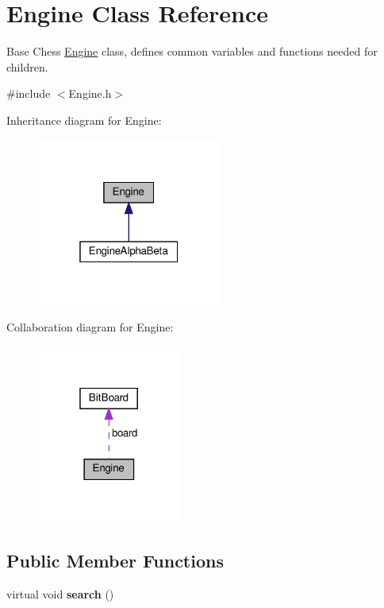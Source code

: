 \hypertarget{classEngine}{}\section{Engine Class Reference}
\label{classEngine}


Base Chess \hyperlink{classEngine}{Engine} class, defines common variables and functions needed for children.  




{\ttfamily \#include $<$Engine.\+h$>$}



Inheritance diagram for Engine\+:\nopagebreak
\begin{figure}[H]
\begin{center}
\leavevmode
\includegraphics[width=172pt]{classEngine__inherit__graph}
\end{center}
\end{figure}


Collaboration diagram for Engine\+:\nopagebreak
\begin{figure}[H]
\begin{center}
\leavevmode
\includegraphics[width=135pt]{classEngine__coll__graph}
\end{center}
\end{figure}
\subsection*{Public Member Functions}
\begin{DoxyCompactItemize}
\item 
\mbox{\label{classEngine_a28c4c89b8c2f42e2d88d3c5d315b5d3e}} 
virtual void {\bfseries search} ()
\end{DoxyCompactItemize}
